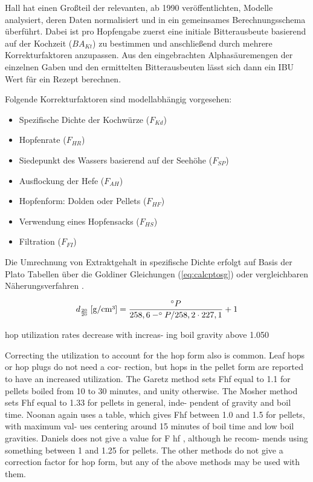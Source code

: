 \documentclass[a4paper,parskip=half]{scrartcl}
\newcommand{\BAKt}{{\mathit{BA}}_{\mathit{Kt}}}
\newcommand{\uden}{\:[\textrm{g/cm³}]}
\newcommand{\FKd}{F_{\mathit{Kd}}}
\newcommand{\FHR}{F_{\mathit{HR}}}
\newcommand{\FSP}{F_{\mathit{SP}}}
\newcommand{\FAH}{F_{\mathit{AH}}}
\newcommand{\FHF}{F_{\mathit{HF}}}
\newcommand{\FHS}{F_{\mathit{HS}}}
\newcommand{\FFil}{F_{\mathit{FI}}}
\begin{document}
Hall hat einen Großteil der relevanten, ab 1990 veröffentlichten, Modelle analysiert,
deren Daten normalisiert und in ein gemeinsames Berechnungsschema überführt. Dabei ist
pro Hopfengabe zuerst eine initiale Bitterausbeute basierend auf der Kochzeit
($\BAKt$) zu bestimmen und anschließend durch mehrere Korrekturfaktoren anzupassen.
Aus den eingebrachten Alphasäuremengen der einzelnen Gaben und den ermittelten
Bitterausbeuten lässt sich dann ein IBU Wert für ein Rezept berechnen. \parencite[59-65]{Hall1997}


Folgende Korrekturfaktoren sind modellabhängig vorgesehen:

\begin{itemize}
\item Spezifische Dichte der Kochwürze ($\FKd$)
\item Hopfenrate ($\FHR$)
\item Siedepunkt des Wassers basierend auf der Seehöhe ($\FSP$)
\item Ausflockung der Hefe ($\FAH$)
\item Hopfenform: Dolden oder Pellets ($\FHF$)
\item Verwendung eines Hopfensacks ($\FHS$)
\item Filtration ($\FFil$)
\end{itemize}

Die Umrechnung von Extraktgehalt in spezifische Dichte erfolgt auf Basis
der Plato Tabellen über die Goldiner Gleichungen (\autoref{eq:calcptosg})
oder vergleichbaren Näherungsverfahren \parencite[140\psq]{Spedding2016}.

\begin{equation}
d_{\frac{20}{20}} \uden = \frac{\degree P}{258,6 - \degree P / 258,2 \cdot 227,1} + 1
\label{eq:calcptosg}
\end{equation}

\parencite[62]{Hall1997}
hop utilization rates decrease with increas-
ing boil gravity above 1.050

Correcting the utilization to
account for the hop form also is common.
Leaf hops or hop plugs do not need a cor-
rection, but hops in the pellet form are
reported to have an increased utilization.
The Garetz method sets Fhf equal to 1.1 for
pellets boiled from 10 to 30 minutes, and
unity otherwise. The Mosher method sets
Fhf equal to 1.33 for pellets in general, inde-
pendent of gravity and boil time. Noonan
again uses a table, which gives Fhf between
1.0 and 1.5 for pellets, with maximum val-
ues centering around 15 minutes of boil
time and low boil gravities. Daniels does not
give a value for F hf , although he recom-
mends using something between 1 and 1.25
for pellets. The other methods do not give
a correction factor for hop form, but any of
the above methods may be used with them.
\end{document}
